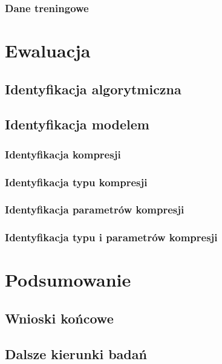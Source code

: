 \documentclass[pl,12pt]{aghdpl}
\let\Oldchapter\chapter%
\renewcommand{\chapter}{\FloatBarrier\Oldchapter}
\let\Oldsection\section%
\renewcommand{\section}{\FloatBarrier\Oldsection}
\let\Oldsubsection\subsection%
\renewcommand{\subsection}{\FloatBarrier\Oldsubsection}
\begin{document}
\subsection{Dane treningowe}
\chapter{Ewaluacja}
\section{Identyfikacja algorytmiczna}
\section{Identyfikacja modelem}
\subsection{Identyfikacja kompresji}
\subsection{Identyfikacja typu kompresji}
\subsection{Identyfikacja parametrów kompresji}
\subsection{Identyfikacja typu i parametrów kompresji}
\chapter{Podsumowanie}
\section{Wnioski końcowe}
\section{Dalsze kierunki badań}

\cleardoublepage{}
\printbibliography{}
\end{document}
